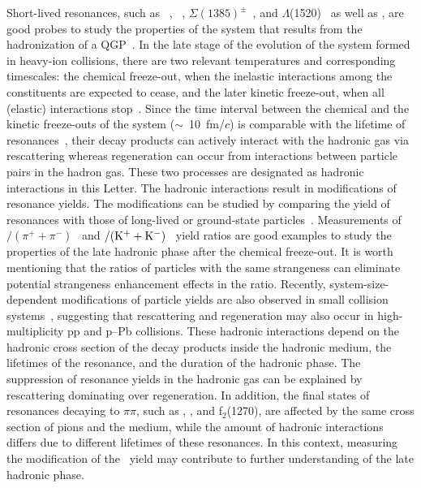Short-lived resonances, such as \rhoz~\cite{ALICE:2018qdv}, \kstar~\cite{ALICE:2019etb, ALICE:2016sak}, $\Sigma(1385)^{\pm}$~\cite{ALICE:2022zuc}, and $\Lambda$(1520)~\cite{ALICE:2018ewo} as well as \fzero, are good probes to study the properties of the system that results from the hadronization of a QGP~\cite{Bierlich:2021poz, Knospe:2015nva}. In the late stage of the evolution of the system formed in heavy-ion collisions, there are two relevant temperatures and corresponding timescales: the chemical freeze-out, when the inelastic interactions among the constituents are expected to cease, and the later kinetic freeze-out, when all (elastic) interactions stop~\cite{Song:1996ik}. Since the time interval between the chemical and the kinetic freeze-outs of the system ($\sim$~10~fm/$c$) is comparable with the lifetime of resonances~\cite{ALICE:2011dyt, ALICE:2019xyr}, their decay products can actively interact with the hadronic gas via rescattering whereas regeneration can occur from interactions between particle pairs in the hadron gas. These two processes are designated as hadronic interactions in this Letter. The hadronic interactions result in modifications of resonance yields. The modifications can be studied by comparing the yield of resonances with those of long-lived or ground-state particles~\cite{ALICE:2018pal}. Measurements of \rhoz$/(\pi^{+}+\pi^{-})$~\cite{ALICE:2018qdv} and \kstar$\rm{}/(K^{+}+K^{-})$~\cite{ALICE:2019etb, ALICE:2016sak} yield ratios are good examples to study the properties of the late hadronic phase after the chemical freeze-out. It is worth mentioning that the ratios of particles with the same strangeness can eliminate potential strangeness enhancement effects in the ratio. Recently, system-size-dependent modifications of particle yields are also observed in small collision systems~\cite{ALICE:2016sak, ALICE:2019etb}, suggesting that rescattering and regeneration may also occur in high-multiplicity pp and p--Pb collisions. These hadronic interactions depend on the hadronic cross section of the decay products inside the hadronic medium, the lifetimes of the resonance, and the duration of the hadronic phase. The suppression of resonance yields in the hadronic gas can be explained by rescattering dominating over regeneration. In addition, the final states of resonances decaying to $\pi\pi$, such as \fzero, \rhoz, and f$_{2}$(1270), are affected by the same cross section of pions and the medium, while the amount of hadronic interactions differs due to different lifetimes of these resonances. In this context, measuring the modification of the \fzero~yield may contribute to further understanding of the late hadronic phase.

